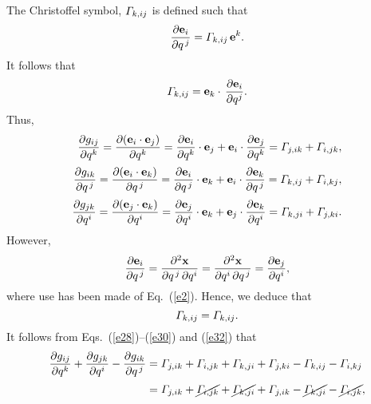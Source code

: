\documentclass[12pt,prb,aps,notitlepage]{revtex4-1}
\begin{document}
The Christoffel symbol, ${\mit\Gamma}_{k,ij}$ is defined such that 
\begin{equation}\label{e25}
\frac{\partial {\bf e}_i}{\partial q^{\,j}} = {\mit\Gamma}_{k,ij}\,{\bf e}^k.
\end{equation}
It follows that 
\begin{equation}
{\mit\Gamma}_{k,ij} = {\bf e}_k\cdot\,\frac{\partial {\bf e}_i}{\partial q^j}.
\end{equation}
Thus, 
\begin{align}\label{e28}
\frac{\partial g_{ij}}{\partial q^k} = \frac{\partial ({\bf e}_i\cdot{\bf e}_j)}{\partial q^k}= \frac{\partial {\bf e}_i}{\partial q^k}\cdot{\bf e}_j + {\bf e}_i\cdot\frac{\partial {\bf e}_j}{\partial q^k}= {\mit\Gamma}_{j,ik} + {\mit\Gamma}_{i,jk},\\[0.5ex]
\frac{\partial g_{ik}}{\partial q^{\,j}} = \frac{\partial ({\bf e}_i\cdot{\bf e}_k)}{\partial q^{\,j}}= \frac{\partial {\bf e}_i}{\partial q^{\,j}}\cdot{\bf e}_k+ {\bf e}_i\cdot\frac{\partial {\bf e}_k}{\partial q^{\,j}}= {\mit\Gamma}_{k,ij} + {\mit\Gamma}_{i,kj},\\[0.5ex]
\frac{\partial g_{jk}}{\partial q^i} = \frac{\partial ({\bf e}_j\cdot{\bf e}_k)}{\partial q^i}= \frac{\partial {\bf e}_j}{\partial q^i}\cdot{\bf e}_k+ {\bf e}_j\cdot\frac{\partial {\bf e}_k}{\partial q^i}= {\mit\Gamma}_{k,ji} + {\mit\Gamma}_{j,ki}.\label{e30}
\end{align}
However,
\begin{equation}
\frac{\partial{\bf e}_i}{\partial q^{\,j}} = \frac{\partial^2{\bf x}}{\partial q^{\,j}\,\partial q^{i}}= \frac{\partial^2{\bf x}}{\partial q^{i}\,\partial q^{\,j}}
= \frac{\partial{\bf e}_j}{\partial q^i},
\end{equation}
where use has been made of Eq.~(\ref{e2}). Hence, we deduce  that
\begin{equation}\label{e32}
{\mit\Gamma}_{k,ij}= {\mit\Gamma}_{k,ij}.
\end{equation}
It follows  from Eqs.~(\ref{e28})--(\ref{e30}) and (\ref{e32}) that
\begin{align}
\frac{\partial g_{ij}}{\partial q^k} + \frac{\partial g_{jk}}{\partial q^i} -\frac{\partial g_{ik}}{\partial q^{\,j}}& = {\mit\Gamma}_{j,ik} + {\mit\Gamma}_{i,jk}+ {\mit\Gamma}_{k,ji} + {\mit\Gamma}_{j,ki}-{\mit\Gamma}_{k,ij} - {\mit\Gamma}_{i,kj}\nonumber\\[0.5ex]
&= {\mit\Gamma}_{j,ik} + \cancel{{\mit\Gamma}_{i,jk}}+ \cancel{{\mit\Gamma}_{k,ji}} + {\mit\Gamma}_{j,ik}-\cancel{{\mit\Gamma}_{k,ji}} - \cancel{{\mit\Gamma}_{i,jk}},
\end{align}
\end{document}
